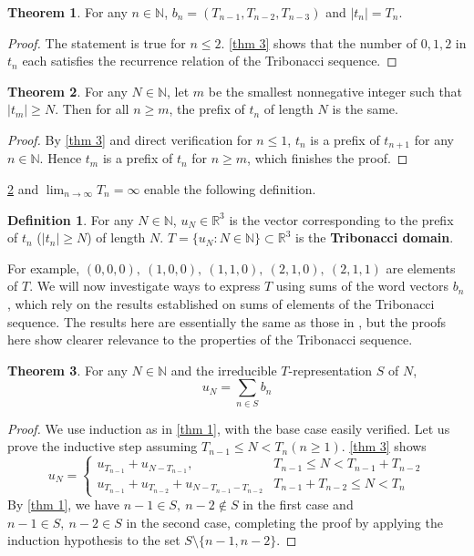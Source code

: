 \documentclass{article}
\theoremstyle{definition}
\newtheorem{theorem}{Theorem}
\newtheorem*{definition}{Definition}
\begin{document}
\begin{theorem}
\label{thm 3-1}
For any $n\in \mathbb{N}$, $b_n=( T_{n-1}, T_{n-2}, T_{n-3})$ and $|t_n|=T_n$.
\end{theorem}
\begin{proof}
The statement is true for $n\leq2$. \cref{thm 3} shows that the number of $0, 1, 2$ in $t_n$ each satisfies the recurrence relation of the Tribonacci sequence.
\end{proof}

\begin{theorem}
\label{thm 3-2}
For any $N\in \mathbb{N}$, let $m$ be the smallest nonnegative integer such that $|t_m|\geq N$. Then for all $n\geq m$, the prefix of $t_n$ of length $N$ is the same.
\end{theorem}
\begin{proof}
By \cref{thm 3} and direct verification for $n\leq1$, $t_n$ is a prefix of $t_{n+1}$ for any $n\in \mathbb{N}$. Hence $t_m$ is a prefix of $t_n$ for $n\geq m$, which finishes the proof.
\end{proof}

\cref{thm 3-2} and $\lim_{n\rightarrow\infty}T_n=\infty$ enable the following definition.

\begin{definition}
For any $N\in\mathbb{N}$, $u_N\in \mathbb{R}^3$ is the vector corresponding to the prefix of $t_n$ ($|t_n|\geq N$) of length $N$. $T=\{u_N:N\in \mathbb{N}\}\subset \mathbb{R}^3$  is the \textbf{Tribonacci domain}.
\end{definition}
For example, $(0,0,0),\ (1,0,0),\ (1,1,0),\ (2,1,0),\ (2,1,1)$ are elements of $T$. We will now investigate ways to express $T$ using sums of the word vectors $b_n$, which rely on the results established on sums of elements of the Tribonacci sequence. The results here are essentially the same as those in \cite{cow}, but the proofs here show clearer relevance to the properties of the Tribonacci sequence.
\begin{theorem}
\label{thm 4}
For any $N\in\mathbb{N}$ and the irreducible $T$-representation $S$ of $N$, \[ u_N=\sum_{n\in S} b_n\]
\end{theorem}
\begin{proof}
We use induction as in \cref{thm 1}, with the base case easily verified. Let us prove the inductive step assuming $T_{n-1}\leq N<T_n(n\geq 1)$. \cref{thm 3} shows \[u_N=\begin{cases}
    u_{T_{n-1}}+u_{N-T_{n-1}}, &T_{n-1}\leq N<T_{n-1}+T_{n-2}\\ 
    u_{T_{n-1}}+u_{T_{n-2}}+u_{N-T_{n-1}-T_{n-2}} &T_{n-1}+T_{n-2}\leq N<T_{n}
\end{cases}\]
By \cref{thm 1}, we have $n-1\in S,\ n-2\notin S$ in the first case and $n-1\in S,\ n-2\in S$ in the second case, completing the proof by applying the induction hypothesis to the set $S\setminus\{n-1, n-2\}$.
\end{proof}
\end{document}

